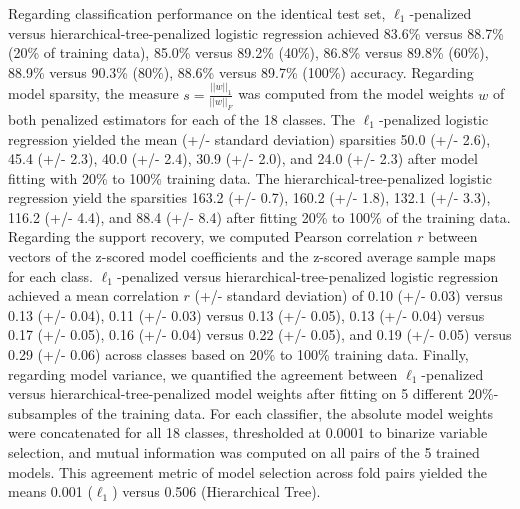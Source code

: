 \documentclass{article}
\begin{document}
Regarding classification performance on the identical test set,
$\ell_1$-penalized versus hierarchical-tree-penalized logistic regression
achieved
83.6\% versus 88.7\% (20\% of training data),
85.0\% versus 89.2\% (40\%),
86.8\% versus 89.8\% (60\%),
88.9\% versus 90.3\% (80\%),
88.6\% versus 89.7\% (100\%) accuracy.
Regarding model sparsity,
the measure $s = \frac{||w||_1}{||w||_F}$ was computed from
the model weights $w$ of both penalized estimators
for each of the 18 classes.
The $\ell_1$-penalized logistic regression
yielded the mean (+/- standard deviation) sparsities
50.0 (+/- 2.6), 45.4 (+/- 2.3), 40.0 (+/- 2.4), 30.9 (+/- 2.0), and 24.0 (+/- 2.3)
after model fitting with 20\% to 100\% training data.
The hierarchical-tree-penalized logistic regression
yield the sparsities
163.2 (+/- 0.7), 160.2 (+/- 1.8), 132.1 (+/- 3.3), 116.2 (+/- 4.4), and 88.4 (+/- 8.4)
after fitting 20\% to 100\% of the training data.
Regarding the support recovery, we computed
Pearson correlation $r$ between vectors of
the z-scored model coefficients
and
the z-scored average sample maps for each class.
$\ell_1$-penalized versus hierarchical-tree-penalized logistic regression
achieved a mean correlation $r$ (+/- standard deviation) of
0.10 (+/- 0.03) versus 0.13 (+/- 0.04),
0.11 (+/- 0.03) versus 0.13 (+/- 0.05),
0.13 (+/- 0.04) versus 0.17 (+/- 0.05),
0.16 (+/- 0.04) versus 0.22 (+/- 0.05), and
0.19 (+/- 0.05) versus 0.29 (+/- 0.06) across classes
based on 20\% to 100\% training data.
Finally, regarding model variance,
we quantified the agreement between
$\ell_1$-penalized versus hierarchical-tree-penalized
model weights after fitting
on 5 different 20\%-subsamples of the training data.
For each classifier,
the absolute model weights were concatenated for all 18 classes,
thresholded at 0.0001 to binarize variable selection,
and mutual information was computed on all pairs
of the 5 trained models.
This agreement metric of model selection across fold pairs
yielded the means 0.001 ($\ell_1$) versus 0.506 (Hierarchical Tree).
\end{document}
